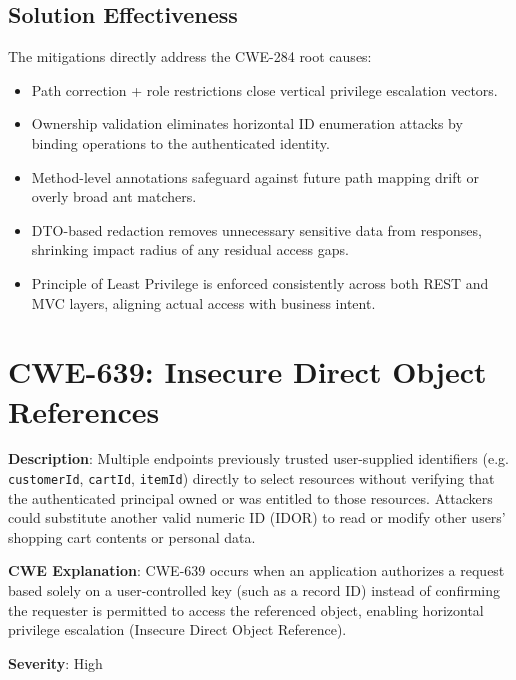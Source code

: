 \documentclass[]{UCD_CS_FYP_Report}
\begin{document}
\subsection{Solution Effectiveness}
The mitigations directly address the CWE-284 root causes:
\begin{itemize}
	\item Path correction + role restrictions close vertical privilege escalation vectors.
	\item Ownership validation eliminates horizontal ID enumeration attacks by binding operations to the authenticated identity.
	\item Method-level annotations safeguard against future path mapping drift or overly broad ant matchers.
	\item DTO-based redaction removes unnecessary sensitive data from responses, shrinking impact radius of any residual access gaps.
	\item Principle of Least Privilege is enforced consistently across both REST and MVC layers, aligning actual access with business intent.
\end{itemize}



\section{CWE-639: Insecure Direct Object References }

	\textbf{Description}: Multiple endpoints previously trusted user-supplied identifiers (e.g. \texttt{customerId}, \texttt{cartId}, \texttt{itemId}) directly to select resources without verifying that the authenticated principal owned or was entitled to those resources. Attackers could substitute another valid numeric ID (IDOR) to read or modify other users' shopping cart contents or personal data.

	\textbf{CWE Explanation}: CWE-639 occurs when an application authorizes a request based solely on a user-controlled key (such as a record ID) instead of confirming the requester is permitted to access the referenced object, enabling horizontal privilege escalation (Insecure Direct Object Reference).

	\textbf{Severity}: High
\end{document}
